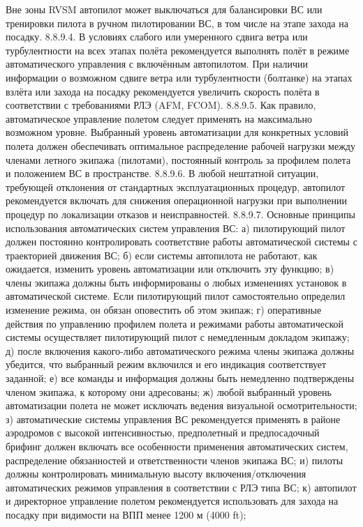 Вне зоны RVSM автопилот может выключаться для балансировки ВС или тренировки пилота в ручном пилотировании ВС, в том числе на этапе захода на посадку.
8.8.9.4. В условиях слабого или умеренного сдвига ветра или турбулентности на всех этапах полёта рекомендуется выполнять полёт в режиме автоматического управления с включённым автопилотом. При наличии информации о возможном сдвиге ветра или турбулентности (болтанке) на этапах взлёта или захода на посадку рекомендуется увеличить скорость полёта в соответствии с требованиями РЛЭ (AFM, FCOM).
8.8.9.5. Как правило, автоматическое управление полетом следует применять на максимально возможном уровне. Выбранный уровень автоматизации для конкретных условий полета должен обеспечивать оптимальное распределение рабочей нагрузки между членами летного экипажа (пилотами), постоянный контроль за профилем полета и положением ВС в пространстве. 
8.8.9.6. В любой нештатной ситуации, требующей отклонения от стандартных эксплуатационных процедур, автопилот рекомендуется включать для снижения операционной нагрузки при выполнении процедур по локализации отказов и неисправностей. 
8.8.9.7. Основные принципы использования автоматических систем управления ВС: 
а)	пилотирующий пилот должен постоянно контролировать соответствие работы автоматической системы с траекторией движения ВС; 
б)	если системы автопилота не работают, как ожидается, изменить уровень автоматизации или отключить эту функцию; 
в)	члены экипажа должны быть информированы о любых изменениях установок в автоматической системе. Если пилотирующий пилот самостоятельно определил изменение режима, он обязан оповестить об этом экипаж; 
г)	оперативные действия по управлению профилем полета и режимами работы автоматической системы осуществляет пилотирующий пилот с немедленным докладом экипажу; 
д)	после включения какого-либо автоматического режима члены экипажа должны убедится, что выбранный режим включился и его индикация соответствует заданной; 
е)	все команды и информация должны быть немедленно подтверждены членом экипажа, к которому они адресованы; 
ж)	любой выбранный уровень автоматизации полета не может исключать ведения визуальной осмотрительности; 
з)	автоматические системы управления ВС рекомендуется применять в районе аэродромов с высокой интенсивностью, предполетный и предпосадочный брифинг должен включать все особенности применения автоматических систем, распределение обязанностей и ответственности членов экипажа ВС; 
и)	пилоты должны контролировать минимальную высоту включения/отключения автоматических режимов управления в соответствии с РЛЭ типа ВС; 
к)	автопилот и директорное управление полетом рекомендуется использовать для захода на посадку при видимости на ВПП менее 1200 м (4000 ft); 

